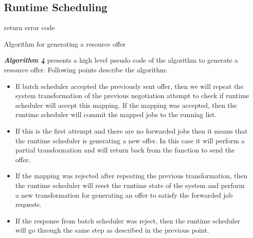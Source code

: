 \subsection{Runtime Scheduling}
\begin{algorithm}[!t]
 \DontPrintSemicolon
 return error code\; 
 \caption{Algorithm for generating a resource offer}
\end{algorithm}
\noindent
\textbf{\textit{Algorithm 4}} presents a high level pseudo code of the algorithm to generate a resource offer. Following points describe the algorithm:
\begin{itemize}
\item If batch scheduler accepted the previously sent offer, then we will repeat the system transformation of the previous negotiation attempt to check if runtime scheduler will accept this mapping. If the mapping was accepted, then the runtime scheduler will commit the mapped jobs to the running list. 
\item If this is the first attempt and there are no forwarded jobs then it means that the runtime scheduler is generating a new offer. In this case it will perform a partial transformation and will return back from the function to send the offer.
\item If the mapping was rejected after repeating the previous transformation, then the runtime scheduler will reset the runtime state of the system and perform a new transformation for generating an offer to satisfy the forwarded job requests.
\item If the response from batch scheduler was reject, then the runtime scheduler will go through the same step as described in the previous point.
\end{itemize}
